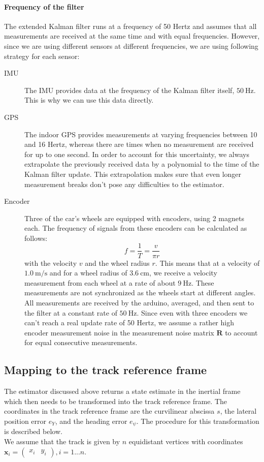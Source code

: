 \paragraph{Frequency of the filter}
The extended Kalman filter runs at a frequency of 50 Hertz and assumes that all measurements are received at the same time and with equal frequencies. However, since we are using different sensors at different frequencies, we are using following strategy for each sensor:
\begin{description}
\item[IMU] The IMU provides data at the frequency of the Kalman filter itself, $\SI{50}{\hertz}$. This is why we  can use this data directly.
\item[GPS] The indoor GPS provides measurements at varying frequencies between 10 and 16 Hertz, whereas there are times when no measurement are received for up to one second. In order to account for this uncertainty, we always extrapolate the previously received data by a polynomial to the time of the Kalman filter update. This extrapolation makes sure that even longer measurement breaks don't pose any difficulties to the estimator.
\item[Encoder] Three of the car's wheels are equipped with encoders, using 2 magnets each. The frequency of signals from these encoders can be calculated as follows:
\begin{equation}
f =\frac{1}{T}=\frac{v}{\pi r}
\end{equation}
with the velocity $v$ and the wheel radius $r$. This means that at a velocity of $\SI{1.0}{\meter\per\second}$ and for a wheel radius of $\SI{3.6}{\centi\meter}$, we receive a velocity measurement from each wheel at a rate of about $\SI{9}{\hertz}$. These measurements are not synchronized as the wheels start at different angles. All measurements are received by the arduino, averaged, and then sent to the filter at a constant rate of $\SI{50}{\hertz}$. Since even with three encoders we can't reach a real update rate of 50 Hertz, we assume a rather high encoder measurement noise in the measurement noise matrix $\bm{R}$ to account for equal consecutive measurements.
\end{description}
\subsection{Mapping to the track reference frame}
The estimator discussed above returns a state estimate in the inertial frame which then needs to be transformed into the track reference frame. The coordinates in the track reference frame are the curvilinear abscissa $s$, the lateral position error $e_Y$, and the heading error $e_\psi$. The procedure for this transformation is described below.\\
We assume that the track is given by $n$ equidistant vertices with coordinates $\bm{x}_i = \begin{pmatrix}
x_i&y_i
\end{pmatrix},i=1...n$.

